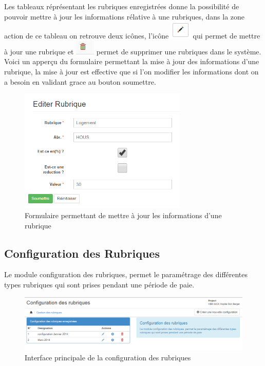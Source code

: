 \documentclass[12pt,a4paper]{report}
\begin{document}
Les tableaux réprésentant les rubriques enregistrées donne la possibilité de pouvoir mettre à jour les informations rélative à une rubriques, dans la zone action de ce tableau on retrouve deux icônes, l'icône \includegraphics[scale=0.7]{pic/EditBlack.png} qui permet de mettre à jour une rubrique et \includegraphics[scale=0.7]{pic/DeleteWRed.png} permet de supprimer une rubriques dans le système.
Voici un apperçu du formulaire permettant la mise à jour des informations d'une rubrique, la mise à jour est effective que si l'on modifier les informations dont on a besoin en validant grace au bouton soumettre. 
\newpage
\begin{figure}[h]
\begin{center}
\includegraphics[width=8cm]{pic/EditRubrique.png}
\end{center}
\caption{Formulaire permettant de mettre à jour les informations d'une rubrique}
\label{Formulaire permettant de mettre à jour les informations d'une rubrique}
\end{figure} 


\subsection{Configuration des Rubriques}
Le module configuration des rubriques, permet le paramétrage des différentes types rubriques qui sont prises pendant une période de paie.

\begin{figure}[h]
\begin{center}
\includegraphics[width=14cm]{pic/ConfigRubriques.png}
\end{center}
\caption{Interface principale de la configuration des rubriques}
\label{Interface principale de la configuration des rubriques}
\end{figure}
\end{document}
